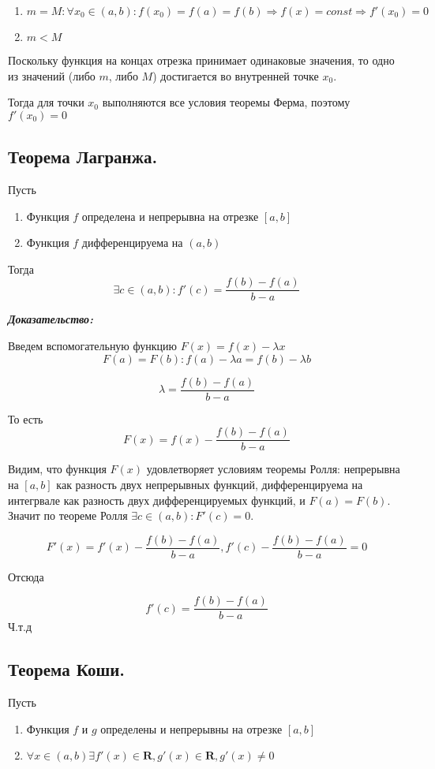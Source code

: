 \documentclass[a4paper,12pt]{article}
\theoremstyle{plain} %
\theoremstyle{definition} %
\theoremstyle{remark} %
\begin{document}
\begin{enumerate}
	\item $m = M: \forall x_0 \in (a, b): f(x_0) = f(a) = f(b) \Rightarrow f(x) = const \Rightarrow f'(x_0) = 0$
	\item $m < M$
\end{enumerate}

Поскольку функция на концах отрезка принимает одинаковые значения, то одно из значений (либо $m$, либо $M$) достигается во внутренней точке $x_0$.

Тогда для точки $x_0$ выполняются все условия теоремы Ферма, поэтому $f'(x_0) = 0$




\newpage
\subsection*{Теорема Лагранжа.                                                                          }

Пусть
\begin{enumerate}
	\item Функция $f$ определена и непрерывна на отрезке $[a, b]$
	\item Функция $f$ дифференцируема на $(a, b)$
\end{enumerate}
Тогда
\[
	\exists c \in (a, b): f'(c) = \frac{f(b) - f(a)}{b - a}
\]

\textit{\textbf{Доказательство:}}

Введем вспомогательную функцию $F(x) = f(x) - \lambda x$
\[
	F(a) = F(b): f(a) - \lambda a = f(b) - \lambda b
\]

\[
	\lambda = \frac{f(b) - f(a)}{b - a}
\]

То есть \[F(x) = f(x) - \frac{f(b) - f(a)}{b - a}\]

Видим, что функция $F(x)$ удовлетворяет условиям теоремы Ролля: непрерывна на $[a, b]$ как разность двух непрерывных функций, дифференцируема на интегрвале как разность двух дифференцируемых функций, и $F(a) = F(b)$. Значит по теореме Ролля $\exists c \in (a, b): F'(c) = 0$.

\[ F'(x) = f'(x) - \frac{f(b) - f(a)}{b - a}, f'(c) - \frac{f(b) - f(a)}{b - a} = 0\]

Отсюда

\[ f'(c) = \frac{f(b) - f(a)}{b - a} \]
Ч.т.д



\newpage
\subsection*{Теорема Коши.                                                                              }
Пусть
\begin{enumerate}
	\item Функция $f$ и $g$ определены и непрерывны на отрезке $[a, b]$
	\item $\forall x \in (a, b) \exists f'(x) \in \mathbf{R}, g'(x) \in \mathbf{R}, g'(x) \neq 0 $
\end{enumerate}
\end{document}
